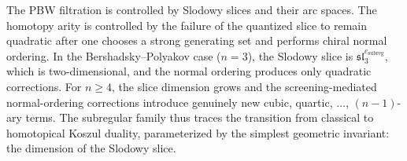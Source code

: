 \begin{remark}
\label{rem:w-subregular-geometric-meaning}
The PBW filtration is controlled by Slodowy slices and their
arc spaces.  The homotopy arity is controlled by the failure of the
quantized slice to remain quadratic after one chooses a strong
generating set and performs chiral normal ordering.  In the
Bershadsky--Polyakov case ($n = 3$), the Slodowy slice is
$\mathfrak{sl}_3^{e_{\mathrm{subreg}}}$, which is two-dimensional,
and the normal ordering produces only quadratic corrections.  For
$n \ge 4$, the slice dimension grows and the screening-mediated
normal-ordering corrections introduce genuinely new cubic, quartic,
$\dots$, $(n-1)$-ary terms.  The subregular family thus traces
the transition from classical to homotopical Koszul duality,
parameterized by the simplest geometric invariant: the dimension of
the Slodowy slice.
\end{remark}
